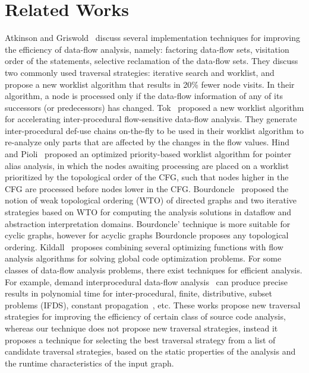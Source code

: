 \section{Related Works}
\label{sec:related}

Atkinson and Griswold~\cite{atkinson2001implementation} discuss several
implementation techniques for improving the efficiency of data-flow analysis,
namely: factoring data-flow sets, visitation order of the statements, selective
reclamation of the data-flow sets. They discuss two commonly used traversal
strategies: iterative search and worklist, and propose a new worklist algorithm
that results in 20\% fewer node visits. In their algorithm, a node is processed
only if the data-flow information of any of its successors (or predecessors) has
changed.
Tok\etal~\cite{tok-etal} proposed a new worklist algorithm for accelerating
inter-procedural flow-sensitive data-flow analysis. They generate
inter-procedural def-use chains on-the-fly to be used in their worklist
algorithm to re-analyze only parts that are affected by the changes in the flow
values.
Hind and Pioli~\cite{hind-pioli} proposed an optimized priority-based worklist
algorithm for pointer alias analysis, in which the nodes awaiting processing
are placed on a worklist prioritized by the topological order of the CFG, such
that nodes higher in the CFG are processed before nodes lower in the CFG.
Bourdoncle~\cite{bourdoncle93} proposed the notion of weak topological ordering
(WTO) of directed graphs and two iterative strategies based on WTO for computing
the analysis solutions in dataflow and abstraction interpretation domains.
Bourdoncle' technique is more suitable for cyclic graphs, however for acyclic
graphs Bourdoncle proposes any topological ordering.
Kildall~\cite{kildall1973unified} proposes combining several optimizing
functions with flow analysis algorithms for solving global code optimization
problems. For some classes of data-flow analysis problems, there exist
techniques for efficient analysis. For example, demand interprocedural data-flow
analysis~\cite{horwitz-etal} can produce precise results in polynomial time for
inter-procedural, finite, distributive, subset problems (IFDS), constant
propagation~\cite{wegman-etal}, etc.
These works propose new traversal strategies for improving the efficiency of
certain class of source code analysis, whereas our technique does not propose
new traversal strategies, instead it proposes a technique for selecting the best
traversal strategy from a list of candidate traversal strategies, based on the
static properties of the analysis and the runtime characteristics of the input
graph.

